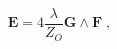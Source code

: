 \begin{equation}
\label{e5:1}
{\mathbf E}=4 \frac{\lambda}{Z_O}{\mathbf G}\wedge {\mathbf F} \; ,
\end{equation}

